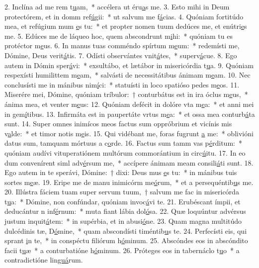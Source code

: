2. Inclína ad me rem t\uline{u}am,~* accélera ut éru\uline{a}s me.
3. Esto mihi in Deum protectórem, et in domm ref\uline{ú}gii:~* ut salvum me f\uline{á}cias.
4. Quóniam fortitúdo mea, et refúgium mum \uline{e}s tu:~* et propter nomen tuum dedúces me, et enútri\uline{e}s me.
5. Edúces me de láqueo hoc, quem abscondrunt m\uline{i}hi:~* quóniam tu es protéctor m\uline{e}us.
6. In manus tuas comméndo spírtum m\uline{e}um:~* redemísti me, Dómine, Deus verit\uline{á}tis.
7. Odísti observántes vnit\uline{á}tes,~* superv\uline{á}cue.
8. Ego autem in Dómin sper\uline{á}vi:~* exsultábo, et lætábor in misericórdia t\uline{u}a.
9. Quóniam respexísti humilittem m\uline{e}am,~* salvásti de necessitátibus ánimam m\uline{e}am.
10. Nec conclusísti me in mánibus nim\uline{í}ci:~* statuísti in loco spatióso pedes m\uline{e}os.
11. Miserére mei, Dómine, quóniam tríbulor:~† conturbátus est in ira óclus m\uline{e}us,~* ánima mea, et venter m\uline{e}us:
12. Quóniam defécit in dolóre vta m\uline{e}a:~* et anni mei in gem\uline{í}tibus.
13. Infirmáta est in paupertáte vrtus m\uline{e}a:~* et ossa mea conturb\uline{á}ta sunt.
14. Super omnes inimícos meos factus sum oppróbrium et vicínis mis v\uline{a}lde:~* et timor notis m\uline{e}is.
15. Qui vidébant me, foras fugrunt \uline{a} me:~* oblivióni datus sum, tamquam mórtuus a c\uline{o}rde.
16. Factus sum tamm vas p\uline{é}rditum:~* quóniam audívi vituperatiónem multórum commorántium in circ\uline{ú}itu.
17. In eo dum convenírent siml adv\uline{é}rsum me,~* accípere ánimam meam consili\uline{á}ti sunt.
18. Ego autem in te sperávi, Dómine:~† dixi: Deus mus \uline{e}s tu:~* in mánibus tuis sortes m\uline{e}æ.
19. Eripe me de manu inimicórm me\uline{ó}rum,~* et a persequéntib\uline{u}s me.
20. Illústra fáciem tuam super servum tuum,~† salvum me fac in misericórda t\uline{u}a:~* Dómine, non confúndar, quóniam invoc\uline{á}vi te.
21. Erubéscant ímpii, et deducántur n inf\uline{é}rnum:~* muta fiant lábia dol\uline{ó}sa.
22. Quæ loquúntur advérsus justum inquit\uline{á}tem:~* in supérbia, et in abusi\uline{ó}ne.
23. Quam magna multitúdo dulcédinis tæ, D\uline{ó}mine,~* quam abscondísti timéntib\uline{u}s te.
24. Perfecísti eis, qui sprant \uline{i}n te,~* in conspéctu filiórum h\uline{ó}minum.
25. Abscóndes eos in abscóndito facii t\uline{u}æ~* a conturbatióne h\uline{ó}minum.
26. Próteges eos in tabernáclo t\uline{u}o~* a contradictióne lin\uline{guá}rum.
